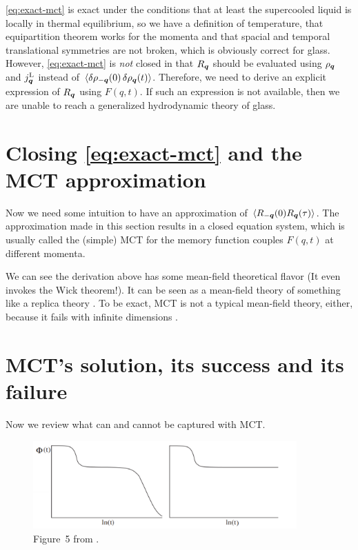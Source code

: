 \documentclass[hyperref, a4paper]{article}
\begin{document}
\eqref{eq:exact-mct} is exact under the conditions that at least the supercooled liquid is locally in thermal
equilibrium, so we have a definition of temperature, that equipartition theorem works for the momenta 
and that spacial and temporal translational symmetries are not broken, which is obviously correct for glass. 
However, \eqref{eq:exact-mct} is \emph{not} closed in that $R_{\vb*{q}}$ should be evaluated using $\rho_{\vb*{q}}$
and $j^\text{L}_{\vb*{q}}$ instead of $\expval*{\var{\rho_{-\vb*{q}}(0)} \var{\rho_{\vb*{q}}(t)}}$. 
Therefore, we need to derive an explicit expression of $R_{\vb*{q}}$ using $F(q, t)$. 
If such an expression is not available, then we are unable to reach a generalized hydrodynamic theory 
of glass. 

\section{Closing \eqref{eq:exact-mct} and the MCT approximation}

Now we need some intuition to have an approximation of $\expval*{R_{-\vb*{q}}(0) R_{\vb*{q}}(\tau)}$.
The approximation made in this section results in a closed equation system, which is usually called 
the (simple) MCT for the memory function couples $F(q, t)$ at different momenta.

We can see the derivation above has some mean-field theoretical flavor (It even invokes the Wick theorem!). 
It can be seen as a mean-field theory of something like a replica theory \cite{Franz_2012}. To be exact,
MCT is not a typical mean-field theory, either, because it fails with infinite dimensions \cite{mct-mft-2010}.

\section{MCT's solution, its success and its failure}

Now we review what can and cannot be captured with MCT. 

\begin{figure}
    \centering
    \includegraphics[width=0.9\textwidth]{glass-fig-5.PNG}
    \caption{Figure~5 from \cite{mct2005}.}
\end{figure}
\end{document}
